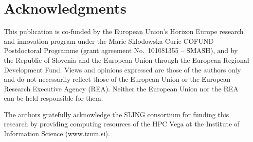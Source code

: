 \documentclass[runningheads]{llncs}
\begin{document}
	\section*{Acknowledgments}
	This publication is co-funded by the European Union’s Horizon Europe research and innovation program under the Marie Sklodowska-Curie COFUND Postdoctoral Programme (grant agreement No.~101081355 -- SMASH), and by the Republic of Slovenia and the European Union through the European Regional Development Fund. Views and opinions expressed are those of the authors only and do not necessarily reflect those of the European Union or the European Research Executive Agency (REA). Neither the European Union nor the REA can be held responsible for them.
	
	The authors gratefully acknowledge the SLING consortium for funding this research by providing computing resources of the HPC Vega at the Institute of Information Science (www.izum.si).
	
	
	
	
	
\end{document}
